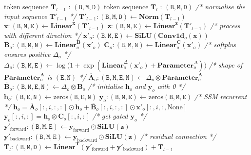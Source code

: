 \documentclass[11pt,a4paper]{article}
\begin{document}
\begin{algorithm}[t]
\caption{Vim block process (after Algorithm~1 of \citet{zhu2024vim}).}
\label{alg:vim}
\small
\begin{algorithmic}[1]
\Require token sequence $\mathbf{T}_{l-1}$ : $(\mathtt{B},\mathtt{M},\mathtt{D})$
\Ensure token sequence $\mathbf{T}_{l}$ : $(\mathtt{B},\mathtt{M},\mathtt{D})$
\State \textit{/* normalise the input sequence $\mathbf{T}'_{l-1}$ */}
\State $\mathbf{T}'_{l-1} : (\mathtt{B},\mathtt{M},\mathtt{D}) \gets \mathbf{Norm}(\mathbf{T}_{l-1})$
\State $\mathbf{x} : (\mathtt{B},\mathtt{M},\mathtt{E}) \gets \mathbf{Linear}^{\mathbf{x}}(\mathbf{T}'_{l-1})$
\State $\mathbf{z} : (\mathtt{B},\mathtt{M},\mathtt{E}) \gets \mathbf{Linear}^{\mathbf{z}}(\mathbf{T}'_{l-1})$
\State \textit{/* process with different direction */}
  \State $\mathbf{x}'_o : (\mathtt{B},\mathtt{M},\mathtt{E}) \gets \mathbf{SiLU}(\mathbf{Conv1d}_o(\mathbf{x}))$
  \State $\mathbf{B}_o : (\mathtt{B},\mathtt{M},\mathtt{N}) \gets \mathbf{Linear}^{\mathbf{B}}_o(\mathbf{x}'_o)$
  \State $\mathbf{C}_o : (\mathtt{B},\mathtt{M},\mathtt{N}) \gets \mathbf{Linear}^{\mathbf{C}}_o(\mathbf{x}'_o)$
  \State \textit{/* softplus ensures positive $\Delta_o$ */}
  \State $\Delta_o : (\mathtt{B},\mathtt{M},\mathtt{E}) \gets \log\bigl(1+\exp(\mathbf{Linear}^{\Delta}_o(\mathbf{x}'_o) + \mathbf{Parameter}^{\Delta}_o)\bigr)$
  \State \textit{/* shape of $\mathbf{Parameter}^{\mathbf{A}}_o$ is $(\mathtt{E},\mathtt{N})$ */}
  \State $\overline{\mathbf{A}}_o : (\mathtt{B},\mathtt{M},\mathtt{E},\mathtt{N}) \gets \Delta_o \otimes \mathbf{Parameter}^{\mathbf{A}}_o$
  \State $\overline{\mathbf{B}}_o : (\mathtt{B},\mathtt{M},\mathtt{E},\mathtt{N}) \gets \Delta_o \otimes \mathbf{B}_o$
  \State \textit{/* initialise $\mathbf{h}_o$ and $\mathbf{y}_o$ with 0 */}
  \State $\mathbf{h}_o : (\mathtt{B},\mathtt{E},\mathtt{N}) \gets \mathrm{zeros}(\mathtt{B},\mathtt{E},\mathtt{N})$
  \State $\mathbf{y}_o : (\mathtt{B},\mathtt{M},\mathtt{E}) \gets \mathrm{zeros}(\mathtt{B},\mathtt{M},\mathtt{E})$
  \State \textit{/* SSM recurrent */}
    \State $\mathbf{h}_o = \overline{\mathbf{A}}_o[:,i,:,:] \odot \mathbf{h}_o + \overline{\mathbf{B}}_o[:,i,:,:] \odot \mathbf{x}'_o[:,i,:,\mathrm{None}]$
    \State $\mathbf{y}_o[:,i,:] = \mathbf{h}_o \otimes \mathbf{C}_o[:,i,:]$
  \EndFor
\EndFor
\State \textit{/* get gated $\mathbf{y}_o$ */}
\State $\mathbf{y}'_{\mathrm{forward}} : (\mathtt{B},\mathtt{M},\mathtt{E}) \gets \mathbf{y}_{\mathrm{forward}} \odot \mathbf{SiLU}(\mathbf{z})$
\State $\mathbf{y}'_{\mathrm{backward}} : (\mathtt{B},\mathtt{M},\mathtt{E}) \gets \mathbf{y}_{\mathrm{backward}} \odot \mathbf{SiLU}(\mathbf{z})$
\State \textit{/* residual connection */}
\State $\mathbf{T}_l : (\mathtt{B},\mathtt{M},\mathtt{D}) \gets \mathbf{Linear}^{\mathbf{T}}(\mathbf{y}'_{\mathrm{forward}} + \mathbf{y}'_{\mathrm{backward}}) + \mathbf{T}_{l-1}$
\end{algorithmic}
\end{algorithm}
\end{document}

